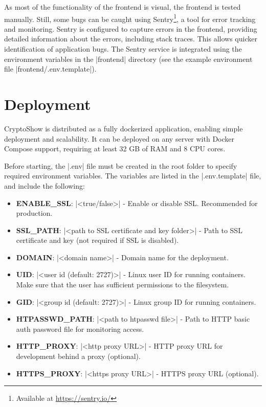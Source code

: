 As most of the functionality of the frontend is visual, the frontend is tested manually. Still, some bugs can be caught using Sentry\footnote{Available at \url{https://sentry.io/}}, a tool for error tracking and monitoring. Sentry is configured to capture errors in the frontend, providing detailed information about the errors, including stack traces. This allows quicker identification of application bugs. The Sentry service is integrated using the environment variables in the \inline|frontend| directory (see the example environment file \inline|frontend/.env.template|).

\section{Deployment}
\label{sec:deployment}

CryptoShow is distributed as a fully dockerized application, enabling simple deployment and scalability. It can be deployed on any server with Docker Compose support, requiring at least 32 GB of RAM and 8 CPU cores.

Before starting, the \inline|.env| file must be created in the root folder to specify required environment variables. The variables are listed in the \inline|.env.template| file, and include the following:

\begin{itemize}
    \item \textbf{ENABLE\_SSL}: \inline|<true/false>| - Enable or disable SSL. Recommended for production.
    \item \textbf{SSL\_PATH}: \inline|<path to SSL certificate and key folder>| - Path to SSL certificate and key (not required if SSL is disabled).
    \item \textbf{DOMAIN}: \inline|<domain name>| - Domain name for the deployment.
    \item \textbf{UID}: \inline|<user id (default: 2727)>| - Linux user ID for running containers. Make sure that the user has sufficient permissions to the filesystem.
    \item \textbf{GID}: \inline|<group id (default: 2727)>| - Linux group ID for running containers.
    \item \textbf{HTPASSWD\_PATH}: \inline|<path to htpasswd file>| - Path to HTTP basic auth password file for monitoring access.
    \item \textbf{HTTP\_PROXY}: \inline|<http proxy URL>| - HTTP proxy URL for development behind a proxy (optional).
    \item \textbf{HTTPS\_PROXY}: \inline|<https proxy URL>| - HTTPS proxy URL (optional).
\end{itemize}

